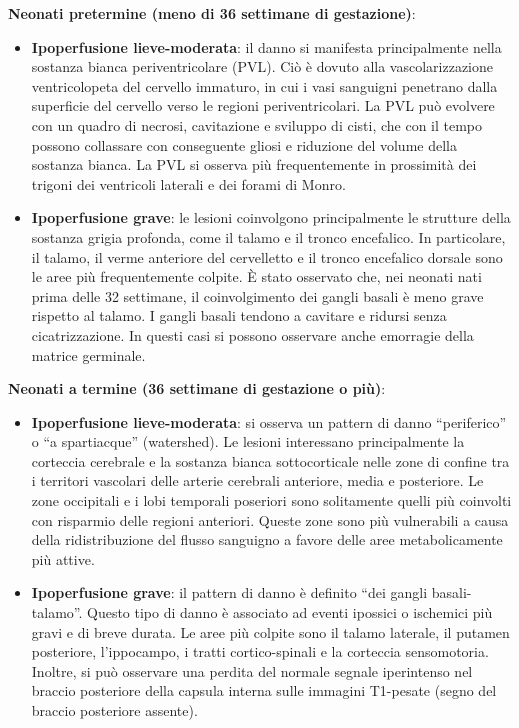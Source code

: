 \textbf{Neonati pretermine (meno di 36 settimane di gestazione)}:

\begin{itemize}
	\tightlist
	\item
	\textbf{Ipoperfusione lieve-moderata}: il danno si manifesta principalmente nella sostanza bianca periventricolare (PVL). Ciò è dovuto alla vascolarizzazione ventricolopeta del cervello immaturo, in cui i vasi sanguigni penetrano dalla superficie del cervello verso le regioni periventricolari. La PVL può evolvere con un quadro di necrosi, cavitazione e sviluppo di cisti, che con il tempo possono collassare con conseguente gliosi e riduzione del volume della sostanza bianca. La PVL si osserva più frequentemente in prossimità dei trigoni dei ventricoli laterali e dei forami di Monro.
	\item
	\textbf{Ipoperfusione grave}: le lesioni coinvolgono principalmente le strutture della sostanza grigia profonda, come il talamo e il tronco encefalico. In particolare, il talamo, il verme anteriore del cervelletto e il tronco encefalico dorsale sono le aree più frequentemente colpite. È stato osservato che, nei neonati nati prima delle 32 settimane, il coinvolgimento dei gangli basali è meno grave rispetto al talamo. I gangli basali tendono a cavitare e ridursi senza cicatrizzazione. In questi casi si possono osservare anche emorragie della matrice germinale.
\end{itemize}

\textbf{Neonati a termine (36 settimane di gestazione o più)}:

\begin{itemize}
	\tightlist
	\item
	\textbf{Ipoperfusione lieve-moderata}: si osserva un pattern di danno ``periferico'' o ``a spartiacque'' (watershed). Le lesioni interessano principalmente la corteccia cerebrale e la sostanza bianca sottocorticale nelle zone di confine tra i territori vascolari delle arterie cerebrali anteriore, media e posteriore. Le zone occipitali e i lobi temporali poseriori sono solitamente quelli più coinvolti con risparmio delle regioni anteriori. Queste zone sono più vulnerabili a causa della ridistribuzione del flusso sanguigno a favore delle aree metabolicamente più attive.
	\item
	\textbf{Ipoperfusione grave}: il pattern di danno è definito ``dei gangli basali-talamo''. Questo tipo di danno è associato ad eventi ipossici o ischemici più gravi e di breve durata. Le aree più colpite sono il talamo laterale, il putamen posteriore, l'ippocampo, i tratti cortico-spinali e la corteccia sensomotoria. Inoltre, si può osservare una perdita del normale segnale iperintenso nel braccio posteriore della capsula interna sulle immagini T1-pesate (segno del braccio posteriore assente).
\end{itemize}

